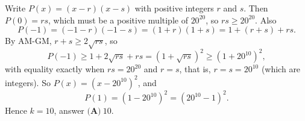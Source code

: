 Write $P(x)=(x-r)(x-s)$ with positive integers $r$ and $s$. Then $P(0)=rs$, which must be a positive multiple of $20^{20}$, so $rs\ge20^{20}$. Also
\[P(-1)=(-1-r)(-1-s)=(1+r)(1+s)=1+(r+s)+rs .\]
By AM-GM, $r+s\ge2\sqrt{rs}$, so
\[P(-1)\ge1+2\sqrt{rs}+rs=\left(1+\sqrt{rs}\right)^2\ge\left(1+20^{10}\right)^2,\]
with equality exactly when $rs=20^{20}$ and $r=s$, that is, $r=s=20^{10}$ (which are integers). So $P(x)=\left(x-20^{10}\right)^2$, and
\[P(1)=\left(1-20^{10}\right)^2=\left(20^{10}-1\right)^2 .\]
Hence $k=10$, answer $\boxed{\textbf{(A)}\ 10}$.
